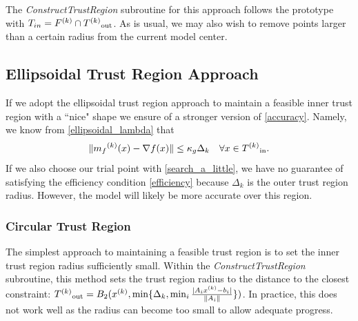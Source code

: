 The \emph{ConstructTrustRegion} subroutine for this approach follows the prototype with $T_{in} = {F}^{(k)} \cap {T^{(k)}}_{\text{out}} $.
As is usual, we may also wish to remove points larger than a certain radius from the current model center.






\subsection{Ellipsoidal Trust Region Approach}

If we adopt the ellipsoidal trust region approach to maintain a feasible inner trust region with a ``nice" shape we ensure of a stronger version of \cref{accuracy}.
Namely, we know from \cref{ellipsoidal_lambda} that 
\[
    \|{{m}_f}^{(k)}(x) - \nabla f(x) \| \le \kappa_g \Delta_{k} \quad \forall x \in {T^{(k)}}_{\text{in}}.
\]
If we also choose our trial point with \cref{search_a_little}, we have no guarantee of satisfying the efficiency condition \cref{efficiency} because $\Delta_k$ is the outer trust region radius.
However, the model will likely be more accurate over this region.


\subsubsection{Circular Trust Region}
The simplest approach to maintaining a feasible trust region is to set the inner trust region radius sufficiently small.
Within the \emph{ConstructTrustRegion} subroutine, this method sets the trust region radius to the distance to the closest constraint:
${T^{(k)}}_{\text{out}} = B_2({x}^{(k)}, \min\{\Delta_k, \min_{i}\frac{|A_i{x}^{(k)} - b_i|}{\|A_i\|} \})$.
In practice, this does not work well as the radius can become too small to allow adequate progress.

